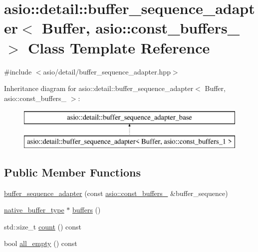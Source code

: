 \hypertarget{classasio_1_1detail_1_1buffer__sequence__adapter_3_01_buffer_00_01asio_1_1const__buffers__1_01_4}{}\section{asio\+:\+:detail\+:\+:buffer\+\_\+sequence\+\_\+adapter$<$ Buffer, asio\+:\+:const\+\_\+buffers\+\_ $>$ Class Template Reference}
\label{classasio_1_1detail_1_1buffer__sequence__adapter_3_01_buffer_00_01asio_1_1const__buffers__1_01_4}


{\ttfamily \#include $<$asio/detail/buffer\+\_\+sequence\+\_\+adapter.\+hpp$>$}

Inheritance diagram for asio\+:\+:detail\+:\+:buffer\+\_\+sequence\+\_\+adapter$<$ Buffer, asio\+:\+:const\+\_\+buffers\+\_ $>$\+:\begin{figure}[H]
\begin{center}
\leavevmode
\includegraphics[height=2.000000cm]{classasio_1_1detail_1_1buffer__sequence__adapter_3_01_buffer_00_01asio_1_1const__buffers__1_01_4}
\end{center}
\end{figure}
\subsection*{Public Member Functions}
\begin{DoxyCompactItemize}
\item 
\hyperlink{classasio_1_1detail_1_1buffer__sequence__adapter_3_01_buffer_00_01asio_1_1const__buffers__1_01_4_a872630f0009e08bc4b97985a5b4f357a}{buffer\+\_\+sequence\+\_\+adapter} (const \hyperlink{classasio_1_1const__buffers__1}{asio\+::const\+\_\+buffers\+\_} \&buffer\+\_\+sequence)
\item 
\hyperlink{classasio_1_1detail_1_1buffer__sequence__adapter__base_a91d037bd052777b8df514e6b94ec9e71}{native\+\_\+buffer\+\_\+type} $\ast$ \hyperlink{classasio_1_1detail_1_1buffer__sequence__adapter_3_01_buffer_00_01asio_1_1const__buffers__1_01_4_a310ff45a4d94659316be4aff190db516}{buffers} ()
\item 
std\+::size\+\_\+t \hyperlink{classasio_1_1detail_1_1buffer__sequence__adapter_3_01_buffer_00_01asio_1_1const__buffers__1_01_4_acac7e476f9e05687855559ce837b5a80}{count} () const 
\item 
bool \hyperlink{classasio_1_1detail_1_1buffer__sequence__adapter_3_01_buffer_00_01asio_1_1const__buffers__1_01_4_a8ecb418ed1f25cfc5e73e7fa7950db15}{all\+\_\+empty} () const 
\end{DoxyCompactItemize}
